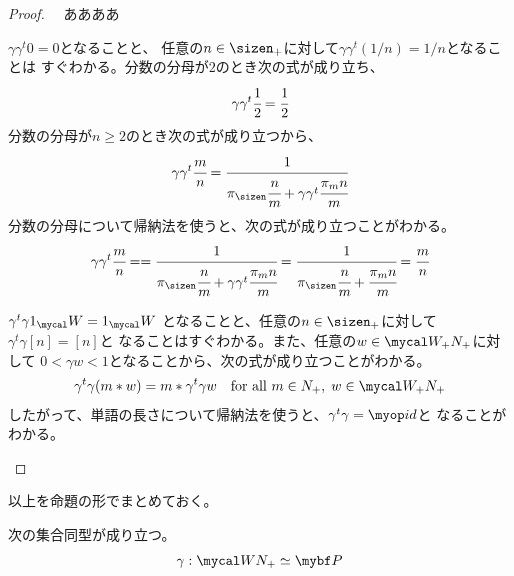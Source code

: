 	\begin{proof}　ああああ
	\begin{description}\setlength{\itemsep}{-1mm} %
		\item[$\gamma\gamma^t=\id$について] $\gamma\gamma^t0=0$となることと、
		任意の$n\in\sizen_+$に対して$\gamma\gamma^t(1/n)=1/n$となることは
		すぐわかる。分数の分母が$2$のとき次の式が成り立ち、
		\begin{equation*}\begin{split}
			\gamma\gamma^t\cfrac{1}{2} = \cfrac{1}{2}
		\end{split}\end{equation*}
		分数の分母が$n\ge2$のとき次の式が成り立つから、
		\begin{equation*}\begin{split}
			\gamma\gamma^t\cfrac{m}{n} = \cfrac{1}{\pi_\sizen\cfrac{n}{m} + \gamma\gamma^t\cfrac{\pi_mn}{m}}
		\end{split}\end{equation*}
		分数の分母について帰納法を使うと、次の式が成り立つことがわかる。
		\begin{equation*}\begin{split}
			\gamma\gamma^t\cfrac{m}{n} = 
			= \cfrac{1}{\pi_\sizen\cfrac{n}{m} + \gamma\gamma^t\cfrac{\pi_mn}{m}}
			= \cfrac{1}{\pi_\sizen\cfrac{n}{m} + \cfrac{\pi_mn}{m}}
			= \cfrac{m}{n}
		\end{split}\end{equation*}
		\item[$\gamma^t\gamma=\id$について] $\gamma^t\gamma1_\Word=1_\Word$
		となることと、任意の$n\in\sizen_+$に対して$\gamma^t\gamma[n]=[n]$と
		なることはすぐわかる。また、任意の$w\in\Word_+N_+$に対して
		$0<\gamma w<1$となることから、次の式が成り立つことがわかる。
		\begin{equation*}\begin{split}
			\gamma^t\gamma(m*w) = m * \gamma^t\gamma w
			\quad\text{for all }m\in N_+,\;w\in \Word_+N_+
		\end{split}\end{equation*}
		したがって、単語の長さについて帰納法を使うと、$\gamma^t\gamma=\id$と
		なることがわかる。
	\end{description} %
	\end{proof}

	以上を命題の形でまとめておく。

	\begin{proposition}[連分数表示]\label{prop:連分数表示} %
		次の集合同型が成り立つ。
		\begin{equation*}\begin{split}
			\gamma: \Word N_+ \simeq \bunsub
		\end{split}\end{equation*}
	\end{proposition} %

